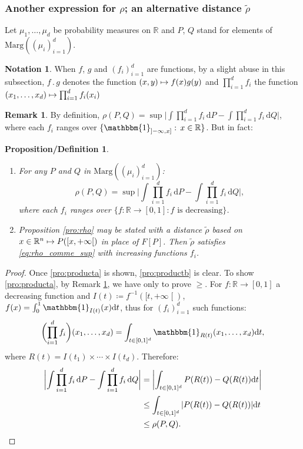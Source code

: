 \documentclass[10pt,a4paper]{article}
\providecommand{\skpt}{\smallskip}
\newcommand{\ldot}{\mathbin{.}}
\newcommand\mto{\mathchoice{\longmapsto}{\mapsto}{\mapsto}{\mapsto}}
\theoremstyle{plain}
\newtheorem{prodefinition}[them]{Proposition/Definition}
\theoremstyle{definition}
\newtheorem{notation}[them]{Notation} %
\newtheorem{rem}[them]{Remark}
\newcommand{\dd}{\mathrm{d}}
\newcommand{\one}{\mathbbm{1}}
\newcommand{\eqdef}{\coloneqq}
\newcommand{\ma}{\mathrm{Marg}}
\newcommand{\R}{\mathbb{R}}
\newcommand{\op}{\mathopen}
\newcommand{\clo}{\mathclose}
\begin{document}
\subsubsection{Another expression for $\rho$; an alternative distance $\tilde \rho$}\label{ss:another}

Let $\mu_1,\ldots,\mu_d$ be probability measures on $\R$ and $P$, $Q$ stand for elements of $\ma((\mu_i)_{i=1}^d)$.

\begin{notation} When $f$, $g$ and $(f_i)_{i=1}^d$ are functions, by a slight abuse in this subsection, $f\ldot g$ denotes the function $(x,y)\mto f(x)g(y)$ and\/ $\prod_{i=1}^df_i$ the function $(x_1,\ldots ,x_d)\mto \prod_{i=1}^df_i(x_i)$
\end{notation}

\begin{rem}\label{rem:product}By definition, $\rho(P,Q)=\sup\bigl|\int \prod_{i=1}^df_i \,\dd P-\int \prod_{i=1}^df_i \,\dd Q \bigr|$, where each $f_i$ ranges over $\{\one_{\op]-\infty,x]}:\,x\in\R\}$. But in fact:
\end{rem}

\skpt
\begin{prodefinition}\label{pro:product}
\begin{enumerate}
\item\label{pro:producta}
For any $P$ and $Q$ in $\ma((\mu_i)_{i=1}^d)$:\vspace*{-3pt}
\begin{equation}\label{eq:rho_comme_sup}
\rho(P,Q)=\sup\biggl|\int\prod_{i=1}^df_i \,\dd P-\int \prod_{i=1}^df_i \,\dd Q \biggr|,
\end{equation}
where each $f_i$ ranges over $\{f:\R\to[0,1]: f\text{ is decreasing}\}$.

\item\label{pro:productb}
Proposition \ref{pro:rho} may be stated with a distance $\tilde\rho$ based on $x\in \R^n\mto P([x,+\infty\clo[)$ in place of $F[P]$. Then $\tilde\rho$ satisfies \eqref{eq:rho_comme_sup} with \emph{increasing} functions $f_i$.
\end{enumerate}
\end{prodefinition}

\begin{proof}
Once \eqref{pro:producta} is shown, \eqref{pro:productb} is clear. To show \eqref{pro:producta}, by Remark \ref{rem:product}, we have only to prove $\geqslant$. For $f:\R\to [0,1]$ a decreasing function and $I(t)\eqdef f^{-1}([t,+\infty\clo[)$, $f(x)=\int_0^1 \one_{I(t)}(x)\dd t$, thus for $(f_i)_{i=1}^d$ such functions:
\[\biggl(\prod_{i=1}^df_i\biggr) (x_1,\ldots, x_d)=\int_{t\in[0,1]^d}\one_{R(t)}(x_1,\ldots,x_d)\dd t,\]
where $R(t)=I(t_1)\times\cdots\times I(t_d)$. Therefore:
\begin{align*}
\biggl|\int \prod_{i=1}^d f_i\,\dd P-\int \prod_{i=1}^d f_i \,\dd Q\biggr|&=\biggl|\int_{t\in[0,1]^d}P(R(t))-Q(R(t))\dd t\biggr|\\
&\leq \int_{t\in[0,1]^d}|P(R(t))-Q(R(t))|\dd t\\
&\leq \rho(P,Q).\qedhere
\end{align*}
\end{proof}
\end{document}
